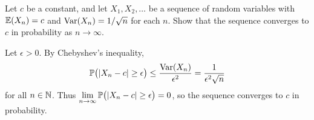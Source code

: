 \begin{exercise}
\begin{questions}

%

\question
Let $c$ be a constant, and let $X_1,X_2,\ldots$ be a sequence of random variables with $\mathbb{E}(X_n) = c$ and $\text{Var}(X_n) = 1/\sqrt{n}$ for each $n$. Show that the sequence converges to $c$ in probability as $n\to\infty$.
\begin{answer} %
Let $\epsilon>0$. By Chebyshev's inequality,
\[
\mathbb{P}\big(|X_n-c|\geq\epsilon\big) \leq \frac{\text{Var}(X_n)}{\epsilon^2} = \frac{1}{\epsilon^2\sqrt{n}}
\]
for all $n\in\mathbb{N}$. Thus $\displaystyle \lim_{n\to\infty} \mathbb{P}\big(|X_n-c|\geq\epsilon\big) = 0$, so the sequence converges to $c$ in probability.
\end{answer}


\end{questions}
\end{exercise}
